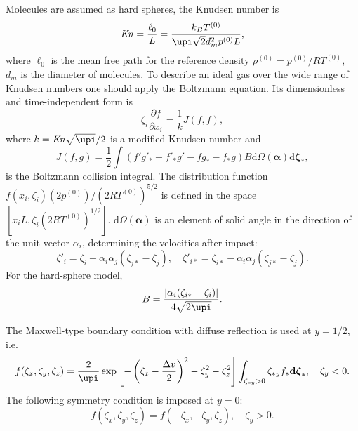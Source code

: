 \documentclass[final]{jfm} %
\newcommand{\Kn}{\mbox{\textit{Kn}}}
\newcommand{\dd}{\mathrm{d}}
\newcommand{\pder}[2][]{\frac{\partial#1}{\partial#2}}
\newcommand{\dzeta}{\boldsymbol{\dd\zeta}}
\begin{document}
Molecules are assumed as hard spheres, the Knudsen number is
\begin{equation}\label{eq:Kn_number}
    \Kn = \frac{\ell_0}{L} = \frac{k_BT^{(0)}}{\upi\sqrt{2} d_m^2p^{(0)}L},
\end{equation}
where \(\ell_0\) is the mean free path for the reference density \(\rho^{(0)} = p^{(0)}/R T^{(0)}\),
\(d_m\) is the diameter of molecules.
To describe an ideal gas over the wide range of Knudsen numbers
one should apply the Boltzmann equation.
Its dimensionless and time-independent form is
\begin{equation}\label{eq:Boltzmann}
    \zeta_i\pder[f]{x_i} = \frac1k J(f,f),
\end{equation}
where \(k = \Kn\sqrt{\upi}/2\) is a modified Knudsen number and
\begin{equation}\label{eq:ci}
    J(f,g) = \frac12 \int (f'g'_* + f'_*g' - fg_* - f_*g) B
    \dd \Omega(\boldsymbol{\alpha}) \dzeta_*,
\end{equation}
is the Boltzmann collision integral.
The distribution function \(f(x_i,\zeta_i)(2p^{(0)})/(2RT^{(0)})^{5/2}\) is defined
in the space \([x_iL, \zeta_i(2RT^{(0)})^{1/2}]\).
\(\dd \Omega(\boldsymbol{\alpha})\) is an element of solid angle in the direction of the unit vector \(\alpha_i\),
determining the velocities after impact:
\begin{equation}\label{eq:after_impact}
    \zeta'_i = \zeta_i + \alpha_i\alpha_j(\zeta_{j*}-\zeta_j), \quad
    \zeta'_{i*} = \zeta_{i*} - \alpha_i\alpha_j(\zeta_{j*}-\zeta_j).
\end{equation}
For the hard-sphere model,
\begin{equation}\label{eq:ci_kernel}
    B = \frac{|\alpha_i(\zeta_{i*}-\zeta_i)|}{4\sqrt{2\upi}}.
\end{equation}

The Maxwell-type boundary condition with diffuse reflection is used at \(y=1/2\), i.e.
\begin{equation}\label{eq:diffuse_bc}
    f(\zeta_x,\zeta_y,\zeta_z) = \frac2{\upi} \exp\left[-\left(\zeta_x-\frac{\Delta{v}}{2}\right)^2-\zeta_y^2-\zeta_z^2\right]
        \int_{\zeta_{*y}>0}\zeta_{*y} f_* \dzeta_*, \quad \zeta_y<0.
\end{equation}
The following symmetry condition is imposed at \(y=0\):
\begin{equation}\label{eq:specular_bc}
    f(\zeta_x,\zeta_y,\zeta_z) = f(-\zeta_x,-\zeta_y,\zeta_z), \quad \zeta_y>0.
\end{equation}
\end{document}
